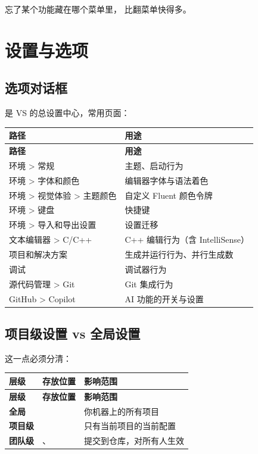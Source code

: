 忘了某个功能藏在哪个菜单里， 比翻菜单快得多。

\section{设置与选项}

\subsection{选项对话框}

 是 VS 的总设置中心，常用页面：

\begin{longtable}{L{6.6cm}L{8.4cm}}\toprule
\textbf{路径} & \textbf{用途} \\ \midrule \endfirsthead
\toprule \textbf{路径} & \textbf{用途} \\ \midrule \endhead
\bottomrule \endlastfoot
环境 > 常规 & 主题、启动行为 \\
环境 > 字体和颜色 & 编辑器字体与语法着色 \\
环境 > 视觉体验 > 主题颜色 & 自定义 Fluent 颜色令牌 \\
环境 > 键盘 & 快捷键 \\
环境 > 导入和导出设置 & 设置迁移 \\
文本编辑器 > C/C++ & C++ 编辑行为（含 IntelliSense） \\
项目和解决方案 & 生成并运行行为、并行生成数 \\
调试 & 调试器行为 \\
源代码管理 > Git & Git 集成行为 \\
GitHub > Copilot & AI 功能的开关与设置 \\
\end{longtable}

\subsection{项目级设置 vs 全局设置}

这一点必须分清：

\begin{longtable}{L{2.6cm}L{5.0cm}L{7.0cm}}\toprule
\textbf{层级} & \textbf{存放位置} & \textbf{影响范围} \\ \midrule \endfirsthead
\toprule \textbf{层级} & \textbf{存放位置} & \textbf{影响范围} \\ \midrule \endhead
\bottomrule \endlastfoot
\textbf{全局} &  & 你机器上的所有项目 \\
\textbf{项目级} &  & 只有当前项目的当前配置 \\
\textbf{团队级} & 、 & 提交到仓库，对所有人生效 \\
\end{longtable}

